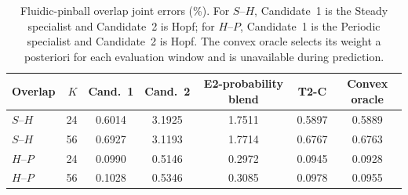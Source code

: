 \begin{table}[H]
\centering
\caption{
Fluidic-pinball overlap joint errors (\%). For $S$--$H$, Candidate~1 is the Steady specialist and Candidate~2 is Hopf; for $H$--$P$, Candidate~1 is the Periodic specialist and Candidate~2 is Hopf.
The convex oracle selects its weight a posteriori for each evaluation window and is unavailable during prediction.
}
\label{tab:pinball_overlap}
\small
\setlength{\tabcolsep}{3.5pt}
\begin{tabular}{lrccccc}
\toprule
Overlap & $K$ & Cand.~1 & Cand.~2 & E2-probability blend & T2-C & Convex oracle \\
\midrule
$S$--$H$ & 24 & 0.6014 & 3.1925 & 1.7511 & 0.5897 & 0.5889 \\
$S$--$H$ & 56 & 0.6927 & 3.1193 & 1.7714 & 0.6767 & 0.6763 \\
$H$--$P$ & 24 & 0.0990 & 0.5146 & 0.2972 & 0.0945 & 0.0928 \\
$H$--$P$ & 56 & 0.1028 & 0.5346 & 0.3085 & 0.0978 & 0.0955 \\
\bottomrule
\end{tabular}
\end{table}
